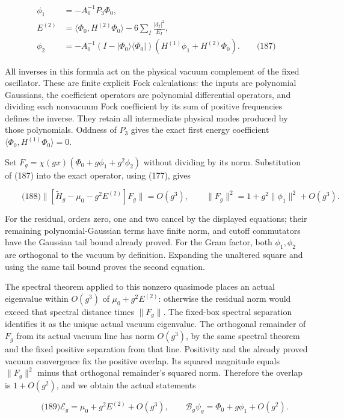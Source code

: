 \[
\begin{aligned}
 \phi_1&=-A_0^{-1}P_3\Phi_0,\\
 E^{(2)}&=\langle\Phi_0,H^{(2)}\Phi_0\rangle
                  -6\sum_I\frac{|d_I|^2}{E_I},\\
 \phi_2&=-A_0^{-1}(I-|\Phi_0\rangle\langle\Phi_0|)
                       (H^{(1)}\phi_1+H^{(2)}\Phi_0).
       \qquad\text{(187)}
\end{aligned}
\]

All inverses in this formula act on the physical vacuum complement of
the fixed oscillator. These are finite explicit Fock calculations: the
inputs are polynomial Gaussians, the coefficient operators are
polynomial differential operators, and dividing each nonvacuum Fock
coefficient by its sum of positive frequencies defines the inverse. They
retain all intermediate physical modes produced by those polynomials.
Oddness of \(P_3\) gives the exact first energy coefficient
\(\langle\Phi_0,H^{(1)}\Phi_0\rangle=0\).

Set \(F_g=\chi(gx)(\Phi_0+g\phi_1+g^2\phi_2)\) without dividing by its
norm. Substitution of (187) into the exact operator, using (177), gives

\[
\qquad\text{(188)}
 \|[\widetilde H_g-\mu_0-g^2E^{(2)}]F_g\|=O(g^3),
 \qquad \|F_g\|^2=1+g^2\|\phi_1\|^2+O(g^3).
\]

For the residual, orders zero, one and two cancel by the displayed
equations; their remaining polynomial-Gaussian terms have finite norm,
and cutoff commutators have the Gaussian tail bound already proved. For
the Gram factor, both \(\phi_1,\phi_2\) are orthogonal to the vacuum by
definition. Expanding the unaltered square and using the same tail bound
proves the second equation.

The spectral theorem applied to this nonzero quasimode places an actual
eigenvalue within \(O(g^3)\) of \(\mu_0+g^2E^{(2)}\): otherwise the
residual norm would exceed that spectral distance times \(\|F_g\|\). The
fixed-box spectral separation identifies it as the unique actual vacuum
eigenvalue. The orthogonal remainder of \(F_g\) from its actual vacuum
line has norm \(O(g^3)\), by the same spectral theorem and the fixed
positive separation from that line. Positivity and the already proved
vacuum convergence fix the positive overlap. Its squared magnitude
equals \(\|F_g\|^2\) minus that orthogonal remainder's squared norm.
Therefore the overlap is \(1+O(g^2)\), and we obtain the actual
statements

\[
\qquad\text{(189)}
 \mathcal E_g=\mu_0+g^2E^{(2)}+O(g^3),\qquad
 \mathcal B_g\psi_g=\Phi_0+g\phi_1+O(g^2).
\]

